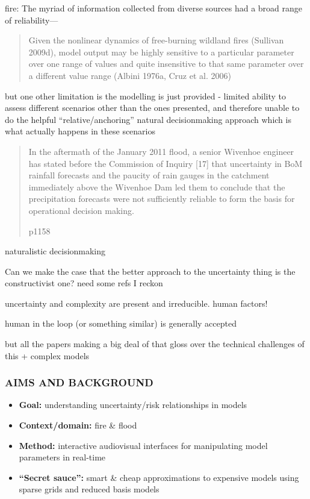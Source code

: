 \documentclass[a4paper,fontsize=12pt]{scrartcl}
\begin{document}
fire: The myriad of information collected from diverse sources had a broad
range of reliability---\parencite{cruz_anatomy_2012}

\blockquote[\cite{alexander_limitations_2013}]{Given the nonlinear
  dynamics of free-burning wildland fires (Sullivan 2009d), model
  output may be highly sensitive to a particular parameter over one
  range of values and quite insensitive to that same parameter over a
  different value range (Albini 1976a, Cruz et al. 2006)}

but one other limitation is the modelling is just provided - limited
ability to assess different scenarios other than the ones presented,
and therefore unable to do the helpful ``relative/anchoring'' natural
decisionmaking approach which is what actually happens in these
scenarios

\blockquote[\cite{vandenhonert_2011_2011} p1158]{In the aftermath of
  the January 2011 flood, a senior Wivenhoe engineer has stated before
  the Commission of Inquiry [17] that uncertainty in BoM rainfall
  forecasts and the paucity of rain gauges in the catchment
  immediately above the Wivenhoe Dam led them to conclude that the
  precipitation forecasts were not sufficiently reliable to form the
  basis for operational decision making.}

naturalistic decisionmaking\parencite{lipshitz_taking_2001}

Can we make the case that the better approach to the uncertainty thing
is the constructivist one? need some refs I reckon


uncertainty and complexity are present and irreducible. human factors!

human in the loop (or something similar) is generally accepted

but all the papers making a big deal of that gloss over the technical
challenges of this + complex models

\subsubsection*{AIMS AND BACKGROUND}

\begin{itemize}
\item \textbf{Goal:} understanding uncertainty/risk relationships in models
\item \textbf{Context/domain:} fire \& flood
\item \textbf{Method:} interactive audiovisual interfaces for
  manipulating model parameters in real-time
\item \textbf{``Secret sauce'':} smart \& cheap approximations to expensive
  models using sparse grids and reduced basis models
\end{itemize}
\end{document}
